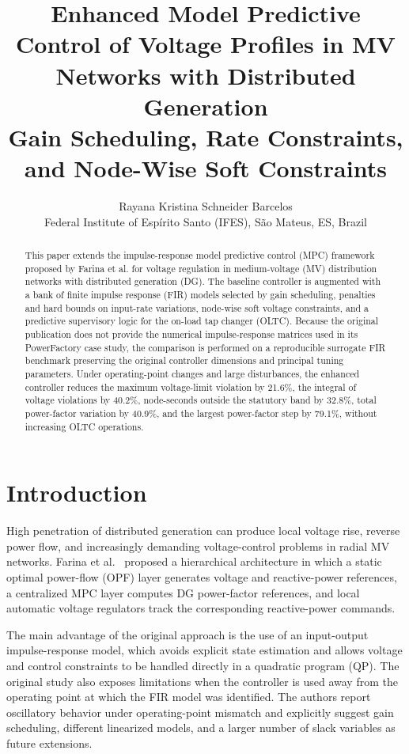 \documentclass[10pt,twocolumn]{article}
\title{\bfseries Enhanced Model Predictive Control of Voltage Profiles in MV Networks with Distributed Generation\\
\large Gain Scheduling, Rate Constraints, and Node-Wise Soft Constraints}
\author{Rayana Kristina Schneider Barcelos\\
\small Federal Institute of Esp\'irito Santo (IFES), S\~ao Mateus, ES, Brazil}
\date{}
\begin{document}
\maketitle

\begin{abstract}
This paper extends the impulse-response model predictive control (MPC) framework proposed by Farina et al. for voltage regulation in medium-voltage (MV) distribution networks with distributed generation (DG). The baseline controller is augmented with a bank of finite impulse response (FIR) models selected by gain scheduling, penalties and hard bounds on input-rate variations, node-wise soft voltage constraints, and a predictive supervisory logic for the on-load tap changer (OLTC). Because the original publication does not provide the numerical impulse-response matrices used in its PowerFactory case study, the comparison is performed on a reproducible surrogate FIR benchmark preserving the original controller dimensions and principal tuning parameters. Under operating-point changes and large disturbances, the enhanced controller reduces the maximum voltage-limit violation by 21.6\%, the integral of voltage violations by 40.2\%, node-seconds outside the statutory band by 32.8\%, total power-factor variation by 40.9\%, and the largest power-factor step by 79.1\%, without increasing OLTC operations.
\end{abstract}

\section{Introduction}
High penetration of distributed generation can produce local voltage rise, reverse power flow, and increasingly demanding voltage-control problems in radial MV networks. Farina et al.~\cite{farina} proposed a hierarchical architecture in which a static optimal power-flow (OPF) layer generates voltage and reactive-power references, a centralized MPC layer computes DG power-factor references, and local automatic voltage regulators track the corresponding reactive-power commands.

The main advantage of the original approach is the use of an input-output impulse-response model, which avoids explicit state estimation and allows voltage and control constraints to be handled directly in a quadratic program (QP). The original study also exposes limitations when the controller is used away from the operating point at which the FIR model was identified. The authors report oscillatory behavior under operating-point mismatch and explicitly suggest gain scheduling, different linearized models, and a larger number of slack variables as future extensions.
\end{document}
